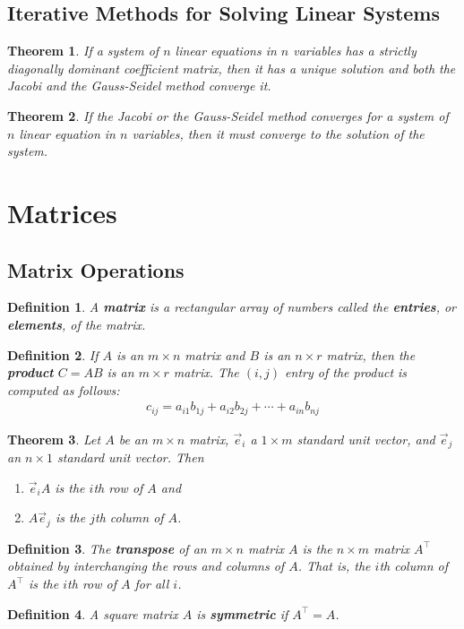 \documentclass{article}
\theoremstyle{sltheorem}
\newtheorem{definition}{Definition}[section]
\newtheorem{theorem}{Theorem}[section]
\begin{document}
\subsection{Iterative Methods for Solving Linear Systems}
\begin{theorem}
    If a system of $n$ linear equations in $n$ variables has a strictly diagonally dominant coefficient matrix, then it has a unique solution and both the Jacobi and the Gauss-Seidel method converge it.
\end{theorem}
\begin{theorem}
    If the Jacobi or the Gauss-Seidel method converges for a system of $n$ linear equation in $n$ variables, then it must converge to the solution of the system.
\end{theorem}
\section{Matrices}
\subsection{Matrix Operations}
\begin{definition}
    A \textbf{matrix} is a rectangular array of numbers called the \textbf{entries}, or \textbf{elements}, of the matrix.
\end{definition}
\begin{definition}
    If $A$ is an $m\times n$ matrix and $B$ is an $n\times r$ matrix, then the \textbf{product} $C=AB$ is an $m\times r$ matrix. The $(i, j)$ entry of the product is computed as follows:
    \begin{gather*}
        c_{ij} = a_{i1}b_{1j}+a_{i2}b_{2j}+\cdots+a_{in}b_{nj}
    \end{gather*}
\end{definition}
\begin{theorem}
    Let $A$ be an $m\times n$ matrix, $\vec e_i$ a $1\times m$ standard unit vector, and $\vec e_j$ an $n\times 1$ standard unit vector. Then
    \begin{enumerate}
        \item $\vec e_iA$ is the $i$th row of $A$ and
        \item $A\vec e_j$ is the $j$th column of $A$.
    \end{enumerate}
\end{theorem}
\begin{definition}
    The \textbf{transpose} of an $m\times n$ matrix $A$ is the $n\times m$ matrix $A^\intercal$ obtained by interchanging the rows and columns of $A$. That is, the $i$th column of $A^\intercal$ is the $i$th row of $A$ for all $i$.
\end{definition}
\begin{definition}
    A square matrix $A$ is \textbf{symmetric} if $A^\intercal = A$.
\end{definition}
\end{document}
